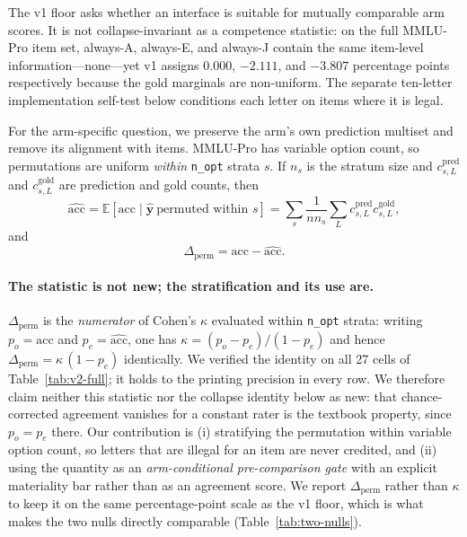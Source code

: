 The v1 floor asks whether an interface is suitable for mutually comparable arm scores. It is not collapse-invariant as a competence statistic: on the full MMLU-Pro item set, always-A, always-E, and always-J contain the same item-level information---none---yet v1 assigns 0.000, $-2.111$, and $-3.807$ percentage points respectively because the gold marginals are non-uniform. The separate ten-letter implementation self-test below conditions each letter on items where it is legal.

For the arm-specific question, we preserve the arm's own prediction multiset and remove its alignment with items. MMLU-Pro has variable option count, so permutations are uniform \emph{within} \texttt{n\_opt} strata $s$. If $n_{s}$ is the stratum size and $c^{\mathrm{pred}}_{s,L}$ and $c^{\mathrm{gold}}_{s,L}$ are prediction and gold counts, then
\begin{equation}
\widehat{\mathrm{acc}}
=\mathbb{E}[\mathrm{acc}\mid \hat{\boldsymbol y}\ \text{permuted within }s]
=\sum_s\frac{1}{n n_{s}}\sum_L c^{\mathrm{pred}}_{s,L}c^{\mathrm{gold}}_{s,L},
\end{equation}
and
\begin{equation}
    \Delta_{\mathrm{perm}}=\mathrm{acc}-\widehat{\mathrm{acc}}.
\end{equation}

\paragraph{The statistic is not new; the stratification and its use are.}
$\Delta_{\mathrm{perm}}$ is the \emph{numerator} of Cohen's $\kappa$ evaluated within
\texttt{n\_opt} strata: writing $p_o=\mathrm{acc}$ and $p_e=\widehat{\mathrm{acc}}$, one has
$\kappa=(p_o-p_e)/(1-p_e)$ and hence $\Delta_{\mathrm{perm}}=\kappa\,(1-p_e)$ identically.
We verified the identity on all 27 cells of Table~\ref{tab:v2-full}; it holds to the printing
precision in every row. We therefore claim neither this statistic nor the collapse identity
below as new: that chance-corrected agreement vanishes for a constant rater is the textbook
property, since $p_o=p_e$ there. Our contribution is (i) stratifying the permutation within
variable option count, so letters that are illegal for an item are never credited, and (ii)
using the quantity as an \emph{arm-conditional pre-comparison gate} with an explicit
materiality bar rather than as an agreement score. We report $\Delta_{\mathrm{perm}}$ rather
than $\kappa$ to keep it on the same percentage-point scale as the v1 floor, which is what
makes the two nulls directly comparable (Table~\ref{tab:two-nulls}).

